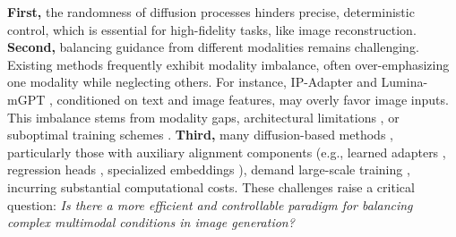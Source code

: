 
\textbf{First,} the randomness of diffusion processes hinders precise, deterministic control, which is essential for high-fidelity tasks, like image reconstruction\citep{wang2025imageeditingdiffusionmodels}.
\textbf{Second,} balancing guidance from different modalities remains challenging. Existing methods frequently exhibit modality imbalance, often over-emphasizing one modality while neglecting others\citep{han2024emmatexttoimagediffusionmodel}. For instance, IP-Adapter \citep{ye2023ip-adapter} and Lumina-mGPT \citep{2024lumina}, conditioned on text and image features, may overly favor image inputs. This imbalance stems from modality gaps, architectural limitations \citep{zhao2023mmicl,Dig2DIG,ye2023ip-adapter}, or suboptimal training schemes \citep{Kosmos-G,han2024emmatexttoimagediffusionmodel}.
\textbf{Third,} many diffusion-based methods \citep{Kosmos-G, emu2}, particularly those with auxiliary alignment components (e.g., learned adapters \citep{Kosmos-G}, regression heads \citep{sun2023emu1,emu2}, specialized embeddings \citep{seed-tokenizer}), demand large-scale training \citep{emu2,Kosmos-G,li2023blipdiffusionpretrainedsubjectrepresentation,2024SeedX}, incurring substantial computational costs.
These challenges raise a critical question: \textit{Is there a more efficient and controllable paradigm for balancing complex multimodal conditions in image generation?}

